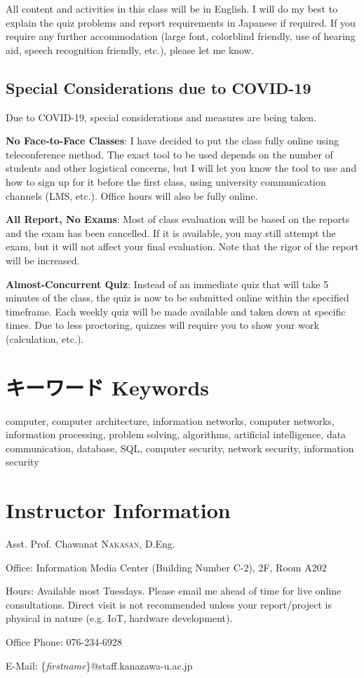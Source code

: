 \documentclass{article}
\begin{document}
All content and activities in this class will be in English. I will do my best to explain the quiz problems and report requirements in Japanese if required. If you require any further accommodation (large font, colorblind friendly, use of hearing aid, speech recognition friendly, etc.), please let me know.

\subsection{Special Considerations due to COVID-19}

Due to COVID-19, special considerations and measures are being taken.

\textbf{No Face-to-Face Classes}: I have decided to put the class fully online using teleconference method. The exact tool to be used depends on the number of students and other logistical concerns, but I will let you know the tool to use and how to sign up for it before the first class, using university communication channels (LMS, etc.). Office hours will also be fully online.

\textbf{All Report, No Exams}: Most of class evaluation will be based on the reports and the exam has been cancelled. If it is available, you may still attempt the exam, but it will not affect your final evaluation. Note that the rigor of the report will be increased.

\textbf{Almost-Concurrent Quiz}: Instead of an immediate quiz that will take 5 minutes of the class, the quiz is now to be submitted online within the specified timeframe. Each weekly quiz will be made available and taken down at specific times. Due to less proctoring, quizzes will require you to show your work (calculation, etc.).

\section{キーワード Keywords}
computer, computer architecture, information networks, computer networks, information processing, problem solving, algorithms, artificial intelligence, data communication, database, SQL, computer security, network security, information security

\section*{Instructor Information}
Asst. Prof. Chawanat \textsc{Nakasan}, D.Eng.

\smallskip\noindent
Office: Information Media Center (Building Number C-2), 2F, Room A202

\smallskip\noindent
Hours: Available most Tuesdays. Please email me ahead of time for live online consultations. Direct visit is not recommended unless your report/project is physical in nature (e.g. IoT, hardware development).

\smallskip\noindent
Office Phone: 076-234-6928

\smallskip\noindent
E-Mail: \{\textit{firstname}\}@staff.kanazawa-u.ac.jp
\end{document}
